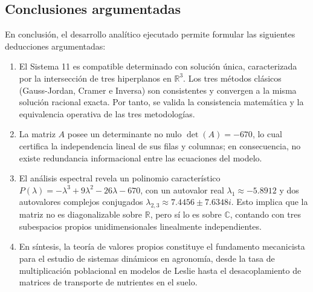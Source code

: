\documentclass[spanish,letterpaper,oneside]{article}
\begin{document}
\subsection{Conclusiones argumentadas}
En conclusión, el desarrollo analítico ejecutado permite formular las siguientes deducciones argumentadas:
\begin{enumerate}
\item El Sistema 11 es compatible determinado con solución única, caracterizada por la intersección de tres hiperplanos en $\mathbb{R}^3$. Los tres métodos clásicos (Gauss-Jordan, Cramer e Inversa) son consistentes y convergen a la misma solución racional exacta. Por tanto, se valida la consistencia matemática y la equivalencia operativa de las tres metodologías.
\item La matriz $A$ posee un determinante no nulo $\det(A) = -670$, lo cual certifica la independencia lineal de sus filas y columnas; en consecuencia, no existe redundancia informacional entre las ecuaciones del modelo.
\item El análisis espectral revela un polinomio característico $P(\lambda) = -\lambda^3 + 9\lambda^2 - 26\lambda - 670$, con un autovalor real $\lambda_1 \approx -5.8912$ y dos autovalores complejos conjugados $\lambda_{2,3} \approx 7.4456 \pm 7.6348i$. Esto implica que la matriz no es diagonalizable sobre $\mathbb{R}$, pero sí lo es sobre $\mathbb{C}$, contando con tres subespacios propios unidimensionales linealmente independientes.
\item En síntesis, la teoría de valores propios constituye el fundamento mecanicista para el estudio de sistemas dinámicos en agronomía, desde la tasa de multiplicación poblacional en modelos de Leslie hasta el desacoplamiento de matrices de transporte de nutrientes en el suelo.
\end{enumerate}

\clearpage
\printbibliography[heading=bibintoc,title={Referencias bibliográficas}]
\end{document}
